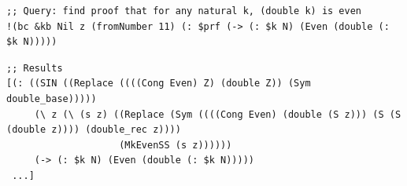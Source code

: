 \documentclass[aspectratio=169]{beamer}
\begin{document}
\begin{frame}[fragile]


  \begin{lstlisting}
;; Query: find proof that for any natural k, (double k) is even
!(bc &kb Nil z (fromNumber 11) (: $prf (-> (: $k N) (Even (double (: $k N)))))
  \end{lstlisting}


  \begin{lstlisting}
;; Results
[(: ((SIN ((Replace ((((Cong Even) Z) (double Z)) (Sym double_base)))))
     (\ z (\ (s z) ((Replace (Sym ((((Cong Even) (double (S z))) (S (S (double z)))) (double_rec z))))
                    (MkEvenSS (s z))))))
     (-> (: $k N) (Even (double (: $k N)))))
 ...]
  \end{lstlisting}


\end{frame}
\end{document}
